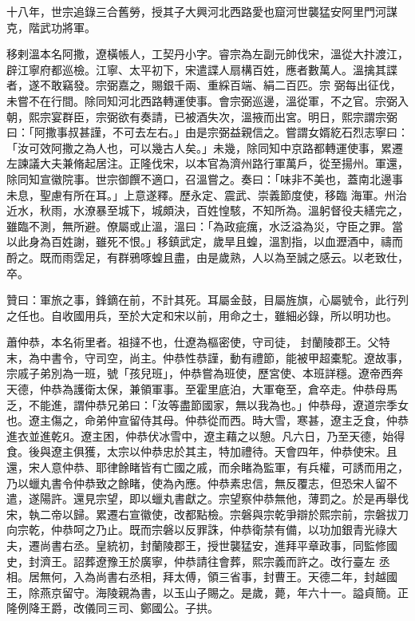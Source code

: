 \begin{pinyinscope}
 十八年，世宗追錄三合舊勞，授其子大興河北西路愛也窟河世襲猛安阿里門河謀克，階武功將軍。



 移剌溫本名阿撒，遼橫帳人，工契丹小字。睿宗為左副元帥伐宋，溫從大抃渡江，辟江寧府都巡檢。江寧、太平初下，宋遣諜人扇構百姓，應者數萬人。溫擒其諜者，遂不敢竊發。宗弼嘉之，賜銀千兩、重綵百端、絹二百匹。宗
 弼每出征伐，未嘗不在行間。除同知河北西路轉運使事。會宗弼巡邊，溫從軍，不之官。宗弼入朝，熙宗宴群臣，宗弼欲有奏請，已被酒失次，溫掖而出宮。明日，熙宗謂宗弼曰：「阿撒事叔甚謹，不可去左右。」由是宗弼益親信之。嘗謂女婿紇石烈志寧曰：「汝可效阿撒之為人也，可以幾古人矣。」未幾，除同知中京路都轉運使事，累遷左諫議大夫兼脩起居注。正隆伐宋，以本官為濟州路行軍萬戶，從至揚州。軍還，除同知宣徽院事。世宗御饌不適口，召溫嘗之。奏曰：「味非不美也，蓋南北邊事未息，聖慮有所在耳。」上意遂釋。歷永定、震武、崇義節度使，移臨
 海軍。州治近水，秋雨，水潦暴至城下，城頗決，百姓惶駭，不知所為。溫躬督役夫繕完之，雖臨不測，無所避。僚屬或止溫，溫曰：「為政疵癘，水泛溢為災，守臣之罪。當以此身為百姓謝，雖死不恨。」移鎮武定，歲旱且蝗，溫割指，以血瀝酒中，禱而酹之。既而雨霑足，有群鴉啄蝗且盡，由是歲熟，人以為至誠之感云。以老致仕，卒。



 贊曰：軍旅之事，鋒鏑在前，不計其死。耳屬金鼓，目屬旌旗，心屬號令，此行列之任也。自收國用兵，至於大定和宋以前，用命之士，雖細必錄，所以明功也。



 蕭仲恭，本名術里者。祖撻不也，仕遼為樞密使，守司徒，
 封蘭陵郡王。父特末，為中書令，守司空，尚主。仲恭性恭謹，動有禮節，能被甲超橐駝。遼故事，宗戚子弟別為一班，號「孩兒班」，仲恭嘗為班使，歷宮使、本班詳穩。遼帝西奔天德，仲恭為護衛太保，兼領軍事。至霍里底泊，大軍奄至，倉卒走。仲恭母馬乏，不能進，謂仲恭兄弟曰：「汝等盡節國家，無以我為也。」仲恭母，遼道宗季女也。遼主傷之，命弟仲宣留侍其母。仲恭從而西。時大雪，寒甚，遼主乏食，仲恭進衣並進乾Я。遼主困，仲恭伏冰雪中，遼主藉之以憩。凡六日，乃至天德，始得食。後與遼主俱獲，太宗以仲恭忠於其主，特加禮待。天會四年，仲恭使宋。且
 還，宋人意仲恭、耶律餘睹皆有亡國之戚，而余睹為監軍，有兵權，可誘而用之，乃以蠟丸書令仲恭致之餘睹，使為內應。仲恭素忠信，無反覆志，但恐宋人留不遣，遂陽許。還見宗望，即以蠟丸書獻之。宗望察仲恭無他，薄罰之。於是再舉伐宋，執二帝以歸。累遷右宣徽使，改都點檢。宗磐與宗乾爭辯於熙宗前，宗磐拔刀向宗乾，仲恭呵之乃止。既而宗磐以反罪誅，仲恭衛禁有備，以功加銀青光祿大夫，遷尚書右丞。皇統初，封蘭陵郡王，授世襲猛安，進拜平章政事，同監修國史，封濟王。詔葬遼豫王於廣寧，仲恭請往會葬，熙宗義而許之。改行臺左
 丞相。居無何，入為尚書右丞相，拜太傅，領三省事，封曹王。天德二年，封越國王，除燕京留守。海陵親為書，以玉山子賜之。是歲，薨，年六十一。謚貞簡。正隆例降王爵，改儀同三司、鄭國公。子拱。




\end{pinyinscope}
